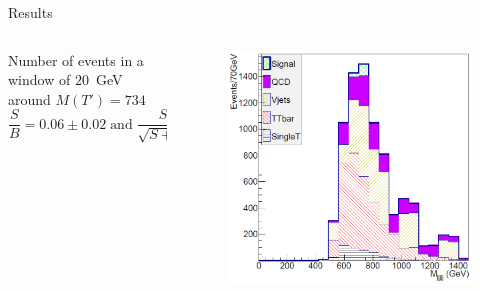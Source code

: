 \begin{frame}{Results}
\vspace{-2.5cm}

\begin{columns}
\begin{column}{.50\textwidth}
\begin{block}{}\scriptsize
Number of events in a window of $20$~GeV around $M(T')=734$ \GeVcc
\begin{equation*}                                               
\frac{S}{B}=0.06\pm 0.02\; \mbox{and} \; \frac{S}{\sqrt{S+B}}=2.0\pm 0.3                                           
\end{equation*}
\end{block}
\end{column}

\begin{column}{.50\textwidth}
\begin{figure}[!Hhtbp]
  \begin{center}
    \includegraphics[width=1.0\textwidth]{../figs/Pheno/Final.png}
  \end{center}
\end{figure}
\end{column}
\end{columns}



\end{frame}
